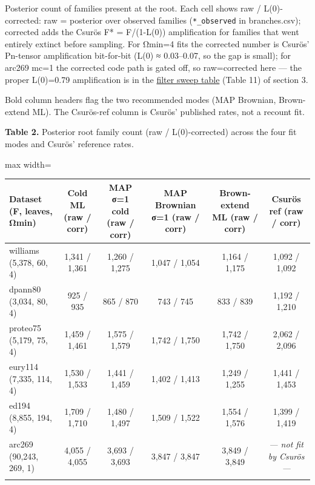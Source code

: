 \documentclass[
  10pt,
]{article}
\begin{document}
Posterior count of families present at the root. Each cell shows raw /
L(0)-corrected: raw = posterior over observed families
(\texttt{*\_observed} in branches.csv); corrected adds the Csurös F* =
F/(1-L(0)) amplification for families that went entirely extinct before
sampling. For Ωmin=4 fits the corrected number is Csurös' Pn-tensor
amplification bit-for-bit (L(0) ≈ 0.03--0.07, so the gap is small); for
arc269 mc=1 the corrected code path is gated off, so raw=corrected here
--- the proper L(0)=0.79 amplification is in the
\hyperref[the-filter-shrinks-the-inferred-ancestor]{filter sweep table}
(Table 11) of section 3.

Bold column headers flag the two recommended modes (MAP Brownian,
Brown-extend ML). The Csurös-ref column is Csurös' published rates, not
a recount fit.

\textbf{Table 2.} Posterior root family count (raw / L(0)-corrected)
across the four fit modes and Csurös' reference rates.

\begin{center}
\begin{adjustbox}{max width=\textwidth}
\begin{tabular}{@{}lccccc@{}}
\toprule\noalign{}
Dataset (F, leaves, Ωmin) & Cold ML (raw / corr) & MAP σ=1 cold (raw /
corr) & \textbf{MAP Brownian σ=1 (raw / corr)} & \textbf{Brown-extend ML
(raw / corr)} & Csurös ref (raw / corr) \\
\midrule\noalign{}
williams (5,378, 60, 4) & 1,341 / 1,361 & 1,260 / 1,275 & 1,047 / 1,054
& 1,164 / 1,175 & 1,092 / 1,092 \\
dpann80 (3,034, 80, 4) & 925 / 935 & 865 / 870 & 743 / 745 & 833 / 839 &
1,192 / 1,210 \\
proteo75 (5,179, 75, 4) & 1,459 / 1,461 & 1,575 / 1,579 & 1,742 / 1,750
& 1,742 / 1,750 & 2,062 / 2,096 \\
eury114 (7,335, 114, 4) & 1,530 / 1,533 & 1,441 / 1,459 & 1,402 / 1,413
& 1,249 / 1,255 & 1,441 / 1,453 \\
ed194 (8,855, 194, 4) & 1,709 / 1,710 & 1,480 / 1,497 & 1,509 / 1,522 &
1,554 / 1,576 & 1,399 / 1,419 \\
arc269 (90,243, 269, 1) & 4,055 / 4,055 & 3,693 / 3,693 & 3,847 / 3,847
& 3,849 / 3,849 & \emph{--- not fit by Csurös ---} \\
\bottomrule\noalign{}
\end{tabular}
\end{adjustbox}
\end{center}
\end{document}
